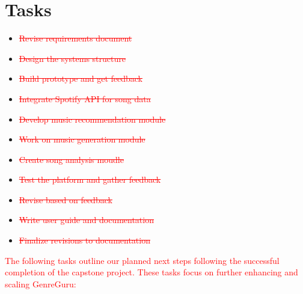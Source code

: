 \documentclass[12pt]{article}
\begin{document}
\section{Tasks}
\begin{itemize}
  \item \textcolor{red}{\sout{Revise requirements document}}
  \item \textcolor{red}{\sout{Design the systems structure}}
  \item \textcolor{red}{\sout{Build prototype and get feedback}}
  \item \textcolor{red}{\sout{Integrate Spotify API for song data}}
  \item \textcolor{red}{\sout{Develop music recommendation module}}
  \item \textcolor{red}{\sout{Work on music generation  module}}
  \item \textcolor{red}{\sout{Create song analysis moudle}}
  \item \textcolor{red}{\sout{Test the platform and gather feedback}}
  \item \textcolor{red}{\sout{Revise based on feedback}}
  \item \textcolor{red}{\sout{Write user guide and documentation}}
  \item \textcolor{red}{\sout{Finalize revisions to documentation}}
\end{itemize}

\noindent \textcolor{red}{The following tasks outline our planned next steps following the successful completion of the capstone project. 
These tasks focus on further enhancing and scaling GenreGuru:}
\end{document}
